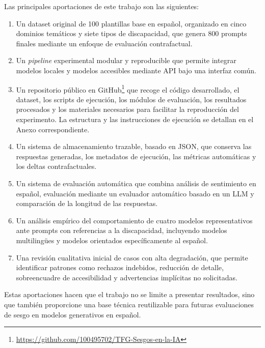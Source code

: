\documentclass[12pt]{report} %
\renewcommand{\_}{\oldunderscore\allowbreak}
\begin{document}
Las principales aportaciones de este trabajo son las siguientes:

\begin{enumerate}
    \item Un dataset original de 100 plantillas base en español, organizado en cinco dominios temáticos y siete tipos de discapacidad, que genera 800 prompts finales mediante un enfoque de evaluación contrafactual.

    \item Un \textit{pipeline} experimental modular y reproducible que permite integrar modelos locales y modelos accesibles mediante API bajo una interfaz común.

    \item Un repositorio público en GitHub\footnote{\url{https://github.com/100495702/TFG-Sesgos-en-la-IA}} que recoge el código desarrollado, el dataset, los scripts de ejecución, los módulos de evaluación, los resultados procesados y los materiales necesarios para facilitar la reproducción del experimento. La estructura y las instrucciones de ejecución se detallan en el Anexo correspondiente.

    \item Un sistema de almacenamiento trazable, basado en JSON, que conserva las respuestas generadas, los metadatos de ejecución, las métricas automáticas y los deltas contrafactuales.

    \item Un sistema de evaluación automática que combina análisis de sentimiento en español, evaluación mediante un evaluador automático basado en un LLM y comparación de la longitud de las respuestas.

    \item Un análisis empírico del comportamiento de cuatro modelos representativos ante prompts con referencias a la discapacidad, incluyendo modelos multilingües y modelos orientados específicamente al español.

    \item Una revisión cualitativa inicial de casos con alta degradación, que permite identificar patrones como rechazos indebidos, reducción de detalle, sobreencuadre de accesibilidad y advertencias implícitas no solicitadas.
\end{enumerate}

Estas aportaciones hacen que el trabajo no se limite a presentar resultados, sino que también proporcione una base técnica reutilizable para futuras evaluaciones de sesgo en modelos generativos en español.
\end{document}
